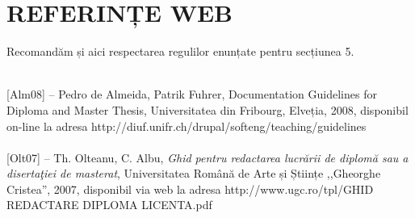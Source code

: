 \chapter{REFERINȚE WEB}
\fontsize{12}{11}\selectfont

Recomandăm și aici respectarea regulilor enunțate pentru secțiunea 5.\\~\\

\begin{singlespace}
\fontsize{12}{11}\selectfont

[Alm08] – Pedro de Almeida, Patrik Fuhrer, Documentation Guidelines for 
Diploma and Master Thesis, Universitatea din Fribourg, Elveția, 2008, 
disponibil on-line la adresa http://diuf.unifr.ch/drupal/softeng/teaching/guidelines \\~\\

[Olt07] – Th. Olteanu, C. Albu, \textit{Ghid pentru redactarea lucrării de diplomă sau 
a disertaţiei de masterat}, Universitatea Română de Arte și Științe ,,Gheorghe Cristea'', 
2007, disponibil via web la adresa http://www.ugc.ro/tpl/GHID REDACTARE DIPLOMA LICENTA.pdf 

\end{singlespace}